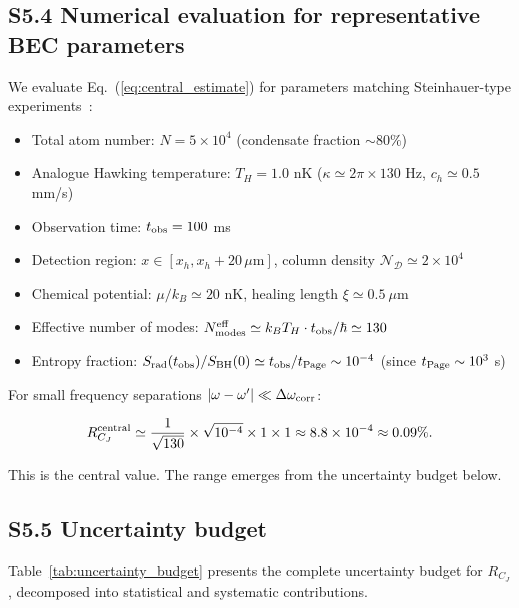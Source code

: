 \documentclass[prd,aps,showpacs,superscriptaddress,twocolumn]{revtex4-2}
\begin{document}
\subsection{S5.4 Numerical evaluation for representative BEC parameters}

We evaluate Eq.~(\ref{eq:central_estimate}) for parameters matching Steinhauer-type experiments~\cite{Steinhauer2016}:

\begin{itemize}
    \item Total atom number: $N = 5 \times 10^4$ (condensate fraction $\sim 80\%$)
    \item Analogue Hawking temperature: $T_H = 1.0$ nK ($\kappa \simeq 2\pi \times 130$ Hz, $c_h \simeq 0.5$ mm/s)
    \item Observation time: $t_{\rm obs} = 100$ ms
    \item Detection region: $x \in [x_h, x_h + 20\,\mu\text{m}]$, column density $\mathcal{N}_{\mathcal{D}} \simeq 2 \times 10^4$
    \item Chemical potential: $\mu / k_B \simeq 20$ nK, healing length $\xi \simeq 0.5\ \mu$m
    \item Effective number of modes: $N_{\rm modes}^{\rm eff} \simeq k_B T_H \cdot t_{\rm obs} / \hbar \simeq 130$
    \item Entropy fraction: $S_{\rm rad}(t_{\rm obs})/S_{\rm BH}(0) \simeq t_{\rm obs} / t_{\rm Page} \sim 10^{-4}$ (since $t_{\rm Page} \sim 10^3$ s)
\end{itemize}

For small frequency separations $|\omega-\omega'| \ll \Delta\omega_{\rm corr}$:

\begin{equation}
R_{C_J}^{\rm central} \simeq \frac{1}{\sqrt{130}} \times \sqrt{10^{-4}} \times 1 \times 1 \approx 8.8 \times 10^{-4} \approx 0.09\%.
\label{eq:central_value}
\end{equation}

This is the central value. The range emerges from the uncertainty budget below.

\subsection{S5.5 Uncertainty budget}

Table~\ref{tab:uncertainty_budget} presents the complete uncertainty budget for $R_{C_J}$, decomposed into statistical and systematic contributions.
\end{document}
